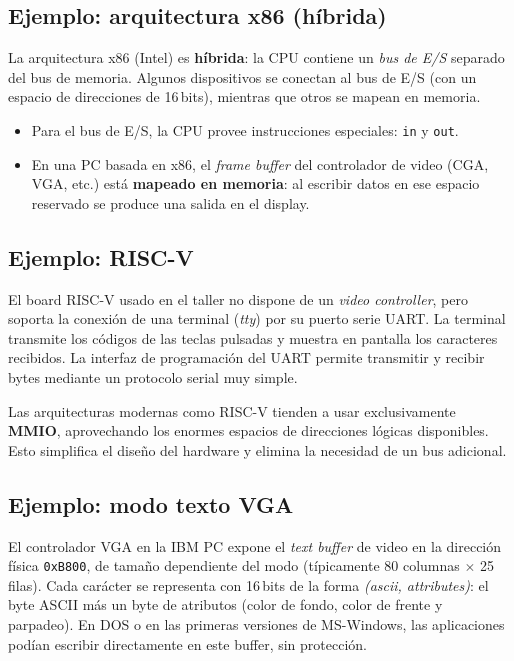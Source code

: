 \documentclass[11pt,a4paper]{article}
\begin{document}
\subsection{Ejemplo: arquitectura x86 (híbrida)}

La arquitectura x86 (Intel) es \textbf{híbrida}: la CPU contiene un
\emph{bus de E/S} separado del bus de memoria. Algunos dispositivos se
conectan al bus de E/S (con un espacio de direcciones de 16\,bits),
mientras que otros se mapean en memoria.

\begin{itemize}[leftmargin=*,nosep]
    \item Para el bus de E/S, la CPU provee instrucciones especiales:
        \texttt{in} y \texttt{out}.
    \item En una PC basada en x86, el \emph{frame buffer} del
        controlador de video (CGA, VGA, etc.) está \textbf{mapeado en
        memoria}: al escribir datos en ese espacio reservado se produce
        una salida en el display.
\end{itemize}

\subsection{Ejemplo: RISC-V}

El board RISC-V usado en el taller no dispone de un \emph{video
controller}, pero soporta la conexión de una terminal (\emph{tty}) por
su puerto serie UART. La terminal transmite los códigos de las teclas
pulsadas y muestra en pantalla los caracteres recibidos. La interfaz
de programación del UART permite transmitir y recibir bytes mediante
un protocolo serial muy simple.

\begin{idea}
Las arquitecturas modernas como RISC-V tienden a usar exclusivamente
\textbf{MMIO}, aprovechando los enormes espacios de direcciones lógicas
disponibles. Esto simplifica el diseño del hardware y elimina la
necesidad de un bus adicional.
\end{idea}

\subsection{Ejemplo: modo texto VGA}

El controlador VGA en la IBM PC expone el \emph{text buffer} de video
en la dirección física \texttt{0xB800}, de tamaño dependiente del modo
(típicamente 80 columnas $\times$ 25 filas). Cada carácter se
representa con 16\,bits de la forma \emph{(ascii, attributes)}: el byte
ASCII más un byte de atributos (color de fondo, color de frente y
parpadeo). En DOS o en las primeras versiones de MS-Windows, las
aplicaciones podían escribir directamente en este buffer, sin
protección.
\end{document}
